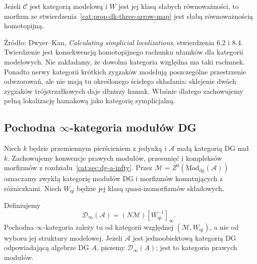 \begin{twierdzenie}\label{cat:thm:dk-three-arrow-model}
Jeżeli $\mathcal C$ jest kategorią modelową i $W$ jest jej klasą słabych równoważności, to morfizm ze stwierdzenia~\ref{cat:prop:dk-three-arrow-map} jest słabą równoważnością homotopijną.
\end{twierdzenie}

Źródło: Dwyer--Kan, \emph{Calculating simplicial localizations}, stwierdzenia 6.2 i 8.4. Twierdzenie jest konsekwencją homotopijnego rachunku ułamków dla kategorii modelowych. Nie zakładamy, że dowolna kategoria względna ma taki rachunek. Ponadto nerwy kategorii krótkich zygzaków modelują poszczególne przestrzenie odwzorowań, ale nie mają tu określonego ścisłego składania: sklejenie dwóch zygzaków trójstrzałkowych daje dłuższy hamak. Właśnie dlatego zachowujemy pełną lokalizację hamakową jako kategorię symplicjalną.

\subsection{Pochodna \texorpdfstring{$\infty$-kategoria}{kategoria wyższa} modułów DG}

Niech $k$ będzie przemiennym pierścieniem z jedynką i $\mathcal A$ małą kategorią DG nad $k$. Zachowujemy konwencje prawych modułów, przesunięć i kompleksów morfizmów z rozdziału~\ref{cat:sec:dg-a-infty}. Przez $\mathcal M=Z^0(\mathrm{Mod}_{\mathrm{dg}}(\mathcal A))$ oznaczamy zwykłą kategorię modułów DG i morfizmów komutujących z różniczkami. Niech $W_{\mathrm{qi}}$ będzie jej klasą quasi-izomorfizmów składowych.

\begin{definicja}\label{cat:def:derived-infty-dg-modules}
Definiujemy
\[
 \mathcal D_\infty(\mathcal A)
   =(N\mathcal M)[W_{\mathrm{qi}}^{-1}]_\infty.
\]
Pochodna $\infty$-kategoria zależy tu od kategorii względnej $(\mathcal M,W_{\mathrm{qi}})$, a nie od wyboru jej struktury modelowej. Jeżeli $\mathcal A$ jest jednoobiektową kategorią DG odpowiadającą algebrze DG $A$, piszemy $\mathcal D_\infty(A)$; jest to kategoria prawych modułów.
\end{definicja}

